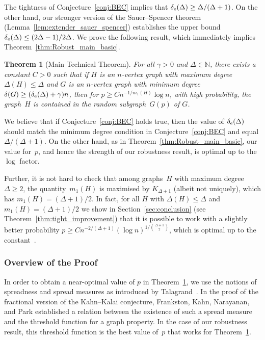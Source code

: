 \documentclass[final]{article}
\newtheorem{theorem}{Theorem}[section]
\theoremstyle{definition}
\newcommand{\exth}{\delta_{\rm e}(\Delta)}
\begin{document}
The tightness of Conjecture~\ref{conj:BEC} implies that
$\exth\ge \Delta/(\Delta+1)$.  On the other hand, our stronger
version of the Sauer--Spencer theorem (Lemma~\ref{lem:extender_sauer_spencer}) establishes the
upper bound~$\exth\le (2\Delta-1)/2\Delta$. We prove the
following result, which immediately implies
Theorem~\ref{thm:Robust_main_basic}.

\begin{theorem}[Main Technical Theorem]
    \label{thm:Robust_main}
    For all\/ $\gamma > 0$ and\/ $\Delta \in \mathbb{N}$, there exists
    a constant\/ $C > 0$ such that if\/ $H$ is an\/ $n$-vertex graph
    with maximum degree\/ $\Delta(H) \leq \Delta$ and\/ $G$ is an\/
    $n$-vertex graph with minimum degree\/
    $\delta(G) \geq (\exth+ \gamma) n$, then for\/
    $p \geq C n^{-1/m_1(H)}\log n$, with high probability, the graph\/~$H$ is contained in the random subgraph~$G(p)$ of $G$.
\end{theorem}

We believe that if Conjecture~\ref{conj:BEC} holds true, then the value of $\exth$ should match the minimum degree condition in Conjecture~\ref{conj:BEC} and equal $\Delta/(\Delta+1)$. 
On the other hand, as in Theorem~\ref{thm:Robust_main_basic}, our value for~$p$, and hence
the strength of our robustness result, is optimal up to the $\log$
factor.

Further, it is not hard to check that among graphs~$H$ with maximum
degree $\Delta\ge2$, the quantity~$m_1(H)$ is maximised by
$K_{\Delta+1}$ (albeit not uniquely), which has
$m_1(H)=(\Delta+1)/2$. In fact, for all $H$ with $\Delta(H) \leq \Delta$ and
$m_1(H)=(\Delta+1)/2$ we show in Section~\ref{sec:conclusion} (see Theorem~\ref{thm:tight_improvement}) that it is possible to work with a slightly better
probability $p \geq Cn^{-2/(\Delta+1)}(\log n)^{1/\binom{\Delta+1}{2}}$, which
is optimal up to the
constant~\cite{FKNP_Fractional_Thresholds}. 

\subsubsection{Overview of the Proof}

In order to obtain a near-optimal value of $p$ in
Theorem~\ref{thm:Robust_main}, we use the notions of spreadness and
spread measures as introduced by
Talagrand~\cite{talagrand_spread_measure}. In the proof of the fractional version of the Kahn--Kalai conjecture, Frankston,
Kahn, Narayanan, and Park \cite{FKNP_Fractional_Thresholds} established
a relation between the existence of such a spread measure and the threshold
function for a graph property. In the case of our robustness result, this threshold function is the best value of~$p$ that works for Theorem~\ref{thm:Robust_main}.
\end{document}
